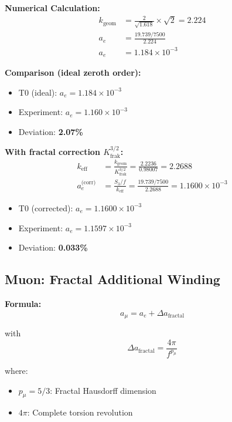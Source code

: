 	\textbf{Numerical Calculation:}
	\begin{align}
		k_{\text{geom}} &= \frac{2}{\sqrt{1.618}} \times \sqrt{2} = 2.224 \\
		a_e &= \frac{19.739 / 7500}{2.224} \\
		a_e &= 1.184 \times 10^{-3}
	\end{align}
	
	\textbf{Comparison (ideal zeroth order):}
	\begin{itemize}
		\item T0 (ideal): $a_e = 1.184 \times 10^{-3}$
		\item Experiment: $a_e = 1.160 \times 10^{-3}$
		\item Deviation: \textbf{2.07\%}
	\end{itemize}
	
	\textbf{With fractal correction $K_\text{frak}^{3/2}$:}
	\begin{align}
		k_\text{eff} &= \frac{k_\text{geom}}{K_\text{frak}^{3/2}} = \frac{2.2236}{0.98007} = 2.2688 \\
		a_e^\text{(corr)} &= \frac{S_3/f}{k_\text{eff}} = \frac{19.739/7500}{2.2688} = 1.1600 \times 10^{-3}
	\end{align}
	\begin{itemize}
		\item T0 (corrected): $a_e = 1.1600 \times 10^{-3}$
		\item Experiment: $a_e = 1.1597 \times 10^{-3}$
		\item Deviation: \textbf{0.033\%}
	\end{itemize}

	
	\subsection{Muon: Fractal Additional Winding}
	
	\textbf{Formula:}
	\begin{equation}
		a_\mu = a_e + \Delta a_{\text{fractal}}
		\label{eq:amu}
	\end{equation}
	
	with
	\begin{equation}
		\Delta a_{\text{fractal}} = \frac{4\pi}{f^{p_\mu}}
		\label{eq:delta_mu}
	\end{equation}
	
	where:
	\begin{itemize}
		\item $p_\mu = 5/3$: Fractal Hausdorff dimension
		\item $4\pi$: Complete torsion revolution
	\end{itemize}
	
